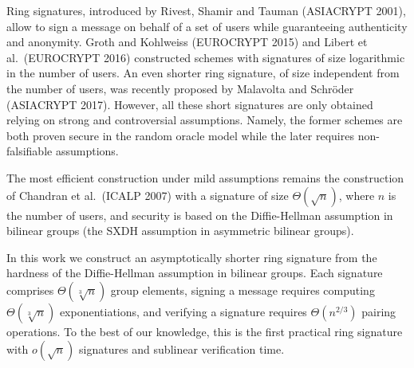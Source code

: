 
Ring signatures, introduced by Rivest, Shamir and Tauman (ASIACRYPT 2001), allow to sign a message on behalf of a set of users while guaranteeing authenticity and anonymity. Groth and Kohlweiss (EUROCRYPT 2015) and Libert et al.~(EUROCRYPT 2016) constructed schemes with signatures of size logarithmic in the number of users. An even shorter ring signature, of size independent from the number of users, was recently proposed by Malavolta and  Schr\"oder (ASIACRYPT 2017).
However, all these short signatures are only obtained relying on strong and controversial assumptions. Namely, the former schemes are both proven secure in the random oracle model while the later requires non-falsifiable assumptions.

The most efficient construction under mild assumptions remains the construction of Chandran et al.~(ICALP 2007) with a signature of size $\Theta(\sqrt{n})$, where $n$ is the number of users, and security is based on the Diffie-Hellman assumption in bilinear groups (the SXDH assumption in asymmetric bilinear groups).

In this work we construct an asymptotically shorter ring signature from the hardness of the Diffie-Hellman assumption in bilinear groups.
 Each signature comprises $\Theta(\sqrt[3]{n})$ group elements, signing a message requires computing $\Theta(\sqrt[3]{n})$ exponentiations, and verifying a signature requires $\Theta(n^{2/3})$ pairing operations. To the best of our knowledge, this is the first practical ring signature with $o(\sqrt{n})$ signatures and sublinear verification time.
